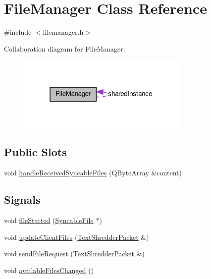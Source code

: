 \hypertarget{class_file_manager}{
\section{FileManager Class Reference}
\label{class_file_manager}
}


{\ttfamily \#include $<$filemanager.h$>$}



Collaboration diagram for FileManager:\nopagebreak
\begin{figure}[H]
\begin{center}
\leavevmode
\includegraphics[width=235pt]{class_file_manager__coll__graph}
\end{center}
\end{figure}
\subsection*{Public Slots}
\begin{DoxyCompactItemize}
\item 
void \hyperlink{class_file_manager_af7782d02aab9b30b0c30a0806e3afdf5}{handleReceivedSyncableFiles} (QByteArray \&content)
\end{DoxyCompactItemize}
\subsection*{Signals}
\begin{DoxyCompactItemize}
\item 
void \hyperlink{class_file_manager_a1478d2bd7bb6b084d2738c447825d8a5}{fileStarted} (\hyperlink{class_syncable_file}{SyncableFile} $\ast$)
\item 
void \hyperlink{class_file_manager_adbc673287db646fa3439f489778959eb}{updateClientFiles} (\hyperlink{class_text_shredder_packet}{TextShredderPacket} \&)
\item 
void \hyperlink{class_file_manager_aeb3e2775406f8de411994fd3f6fd4463}{sendFileRequest} (\hyperlink{class_text_shredder_packet}{TextShredderPacket} \&)
\item 
void \hyperlink{class_file_manager_a6d680024ada196c677fe4bf5ebe781a5}{availableFilesChanged} ()
\end{DoxyCompactItemize}
